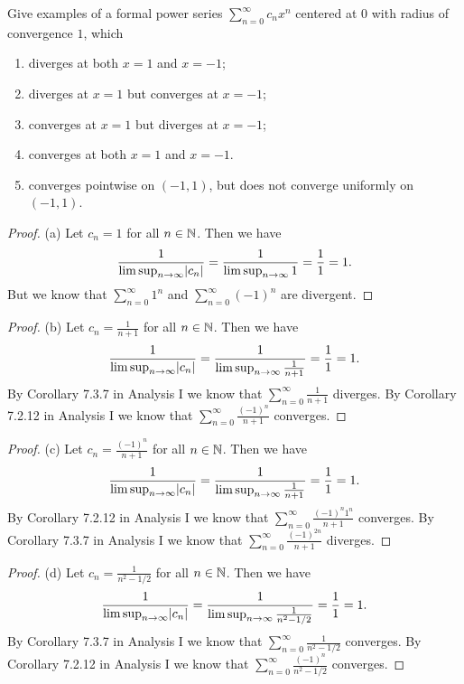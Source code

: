 \begin{ex}\label{ex:4.1.2}
  Give examples of a formal power series \(\sum_{n = 0}^\infty c_n x^n\) centered at \(0\) with radius of convergence \(1\), which
  \begin{enumerate}
    \item diverges at both \(x = 1\) and \(x = -1\);
    \item diverges at \(x = 1\) but converges at \(x = -1\);
    \item converges at \(x = 1\) but diverges at \(x = -1\);
    \item converges at both \(x = 1\) and \(x = -1\).
    \item converges pointwise on \((-1, 1)\), but does not converge uniformly on \((-1, 1)\).
  \end{enumerate}
\end{ex}

\begin{proof}{(a)}
  Let \(c_n = 1\) for all \(n \in \mathbb{N}\).
  Then we have
  \[
    \frac{1}{\limsup_{n \to \infty} \abs{c_n}} = \frac{1}{\limsup_{n \to \infty} 1} = \frac{1}{1} = 1.
  \]
  But we know that \(\sum_{n = 0}^\infty 1^n\) and \(\sum_{n = 0}^\infty (-1)^n\) are divergent.
\end{proof}

\begin{proof}{(b)}
  Let \(c_n = \frac{1}{n + 1}\) for all \(n \in \mathbb{N}\).
  Then we have
  \[
    \frac{1}{\limsup_{n \to \infty} \abs{c_n}} = \frac{1}{\limsup_{n \to \infty} \frac{1}{n + 1}} = \frac{1}{1} = 1.
  \]
  By Corollary 7.3.7 in Analysis I we know that \(\sum_{n = 0}^\infty \frac{1}{n + 1}\) diverges.
  By Corollary 7.2.12 in Analysis I we know that \(\sum_{n = 0}^\infty \frac{(-1)^n}{n + 1}\) converges.
\end{proof}

\begin{proof}{(c)}
  Let \(c_n = \frac{(-1)^n}{n + 1}\) for all \(n \in \mathbb{N}\).
  Then we have
  \[
    \frac{1}{\limsup_{n \to \infty} \abs{c_n}} = \frac{1}{\limsup_{n \to \infty} \frac{1}{n + 1}} = \frac{1}{1} = 1.
  \]
  By Corollary 7.2.12 in Analysis I we know that \(\sum_{n = 0}^\infty \frac{(-1)^n 1^n}{n + 1}\) converges.
  By Corollary 7.3.7 in Analysis I we know that \(\sum_{n = 0}^\infty \frac{(-1)^{2n}}{n + 1}\) diverges.
\end{proof}

\begin{proof}{(d)}
  Let \(c_n = \frac{1}{n^2 - 1 / 2}\) for all \(n \in \mathbb{N}\).
  Then we have
  \[
    \frac{1}{\limsup_{n \to \infty} \abs{c_n}} = \frac{1}{\limsup_{n \to \infty} \frac{1}{n^2 - 1 / 2}} = \frac{1}{1} = 1.
  \]
  By Corollary 7.3.7 in Analysis I we know that \(\sum_{n = 0}^\infty \frac{1}{n^2 - 1 / 2}\) converges.
  By Corollary 7.2.12 in Analysis I we know that \(\sum_{n = 0}^\infty \frac{(-1)^n}{n^2 - 1 / 2}\) converges.
\end{proof}

